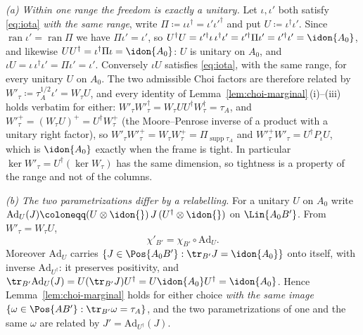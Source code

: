 \begin{remark}
\emph{(a) Within one range the freedom is exactly a unitary.} Let
$\iota,\iota'$ both satisfy \eqref{eq:iota} \emph{with the same range},
write $\Pi\coloneqq\iota\iota^{\dagger}=\iota'\iota'^{\dagger}$ and put
$U\coloneqq\iota^{\dagger}\iota'$. Since
$\operatorname{ran}\iota'=\operatorname{ran}\Pi$ we have
$\Pi\iota'=\iota'$, so
$U^{\dagger}U=\iota'^{\dagger}\iota\,\iota^{\dagger}\iota'
=\iota'^{\dagger}\Pi\iota'=\iota'^{\dagger}\iota'=\idon{A_0}$, and
likewise $UU^{\dagger}=\iota^{\dagger}\Pi\iota=\idon{A_0}$: $U$ is unitary
on $A_0$, and
$\iota U=\iota\,\iota^{\dagger}\iota'=\Pi\iota'=\iota'$. Conversely
$\iota U$ satisfies \eqref{eq:iota}, with the same range, for every
unitary $U$ on $A_0$. The two admissible Choi factors are therefore
related by $W'_{\tau}\coloneqq\tau_A^{1/2}\iota'=W_{\tau}U$, and every
identity of Lemma~\ref{lem:choi-marginal}\,(i)--(iii) holds verbatim for
either:
$W'_{\tau}W'^{\dagger}_{\tau}
=W_{\tau}UU^{\dagger}W_{\tau}^{\dagger}=\tau_A$, and
$W'^{+}_{\tau}=(W_{\tau}U)^{+}=U^{\dagger}W^{+}_{\tau}$ (the
Moore--Penrose inverse of a product with a unitary right factor), so
$W'_{\tau}W'^{+}_{\tau}=W_{\tau}W^{+}_{\tau}
=\Pi_{\operatorname{supp}\tau_A}$ and
$W'^{+}_{\tau}W'_{\tau}=U^{\dagger}P_{\iota}U$, which is $\idon{A_0}$
exactly when the frame is tight. In particular $\ker W'_{\tau}
=U^{\dagger}(\ker W_{\tau})$ has the same dimension, so tightness is a
property of the range and not of the columns.

\emph{(b) The two parametrizations differ by a relabelling.} For a unitary
$U$ on $A_0$ write
$\mathrm{Ad}_{U}(J)\coloneqq(U\otimes\idon{})\,J\,
(U^{\dagger}\otimes\idon{})$ on $\Lin{A_0B'}$. From
$W'_{\tau}=W_{\tau}U$,
\begin{equation}\label{eq:chi-relabel}
  \chi'_{B'}=\chi_{B'}\circ\mathrm{Ad}_{U}.
\end{equation}
Moreover $\mathrm{Ad}_{U}$ carries
$\{J\in\Pos{A_0B'}:\tr_{B'}J=\idon{A_0}\}$ onto itself, with inverse
$\mathrm{Ad}_{U^{\dagger}}$: it preserves positivity, and
$\tr_{B'}\mathrm{Ad}_{U}(J)=U(\tr_{B'}J)U^{\dagger}
=U\idon{A_0}U^{\dagger}=\idon{A_0}$. Hence
Lemma~\ref{lem:choi-marginal} holds for either choice \emph{with the same
image} $\{\omega\in\Pos{AB'}:\tr_{B'}\omega=\tau_A\}$, and the two
parametrizations of one and the same $\omega$ are related by
$J'=\mathrm{Ad}_{U^{\dagger}}(J)$.


\end{remark}
